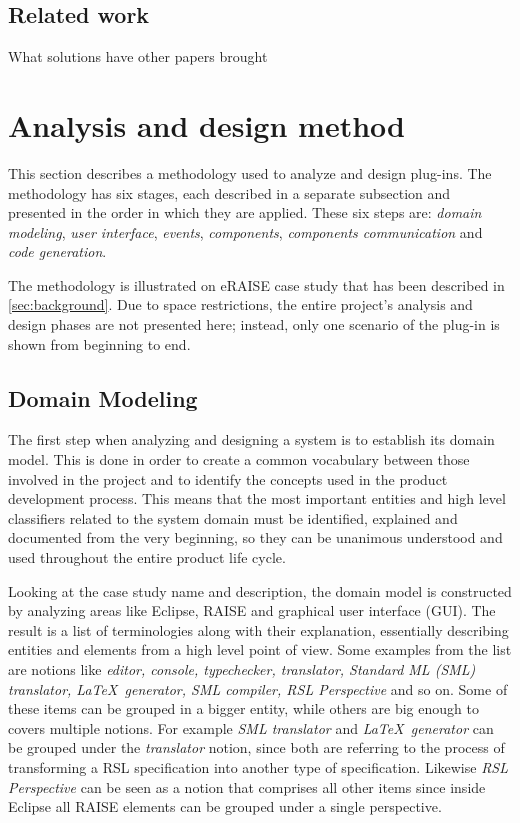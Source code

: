 \documentclass[conference]{IEEEtran}
\begin{document}
%
\subsection{Related work}
\label{sec:related-work}


What solutions have other papers brought

\section{Analysis and design method}
\label{sec:analys-design-meth}

This section describes a methodology used to analyze and design
plug-ins. The methodology has six stages, each described in a separate
subsection and presented in the order in which they are applied. These
six steps are: \emph{domain modeling}, \emph{user interface},
\emph{events}, \emph{components}, \emph{components communication} and
\emph{code generation}.

The methodology is illustrated on eRAISE case study that has been
described in \autoref{sec:background}. Due to space restrictions, the
entire project's analysis and design phases are not presented here;
instead, only one scenario of the plug-in is shown from beginning to
end.

%
\subsection{Domain Modeling}
\label{sec:domain-modeling}

The first step when analyzing and designing a system is to establish
its domain model. This is done in order to create a common vocabulary
between those involved in the project and to identify the concepts
used in the product development process. This means that the most
important entities and high level classifiers related to the system domain must
be identified, explained and documented from the very beginning, so they
can be unanimous understood and used throughout the entire product
life cycle.


Looking at the case study name and description, the domain model is
constructed by analyzing areas like Eclipse, RAISE and graphical user
interface (GUI). The result is a list of terminologies along with
their explanation, essentially describing entities and elements from a
high level point of view. Some examples from the list are notions like
\emph{editor, console, typechecker, translator, Standard ML
(SML) translator, \LaTeX\ generator, SML compiler, RSL
Perspective} and so on. Some of these items can be grouped in a bigger
entity, while others are big enough to covers multiple notions. For
example \emph{SML translator} and \emph{\LaTeX\ generator} can be
grouped under the \emph{translator} notion, since both are referring
to the process of transforming a RSL specification into another type
of specification. Likewise \emph{RSL Perspective} can be seen as a
notion that comprises all other items since inside Eclipse all RAISE
elements can be grouped under a single perspective.
\end{document}
